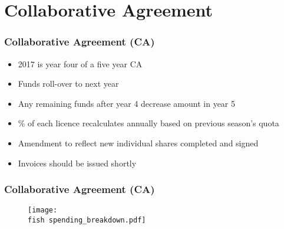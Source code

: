 \documentclass{beamer}
\newcommand{\fish}{C:/Rsaves/fishery/2017/}
\begin{document}



\section{Collaborative Agreement}

\begin{frame}
	
	\frametitle{Collaborative Agreement (CA)}
	
	\vspace*{-0.5cm}
	\begin{block}
		
		\begin{itemize}
			\item 2017 is year four of a five year CA
			\item Funds roll-over to next year
			\item Any remaining funds after year 4 decrease amount in year 5
			\item \% of each licence recalculates annually based on previous season's quota
			\item Amendment to reflect new individual shares completed and signed
			\item Invoices should be issued shortly
			
		\end{itemize}
	\end{block}
	
	
\end{frame}

\begin{frame}
	
	\frametitle{Collaborative Agreement (CA)}
	
	\begin{figure}
		
		\centerline{\texttt{[image: \\fish spending\_breakdown.pdf]}}
		
	\end{figure}
\end{frame}



\end{document}
